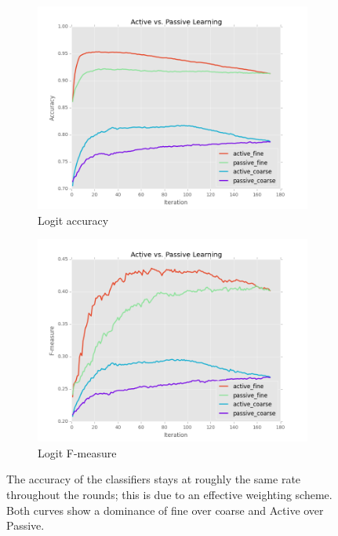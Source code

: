 \documentclass[ms]{nuthesis}
\begin{document}
\FloatBarrier
\begin{figure}[!htb]
    \centering
    \begin{subfigure}[t]{0.75\textwidth}
        \centering
        \includegraphics[width=\textwidth]{fig/runActPassLogReg_acc}
        \caption{Logit accuracy}
    \end{subfigure}%

    \begin{subfigure}[t]{0.75\textwidth}
        \centering
        \includegraphics[width=\textwidth]{fig/runActPassLogReg_f1}
        \caption{Logit F-measure}
    \end{subfigure}
    \caption{The accuracy of the classifiers stays at
roughly the same rate throughout the rounds; this is due to an effective
weighting scheme. Both curves show a dominance of fine over coarse and
Active over Passive.}
    \label{fig:ActiveVsPassiveAccFmesLR}
\end{figure}
\FloatBarrier
\end{document}
